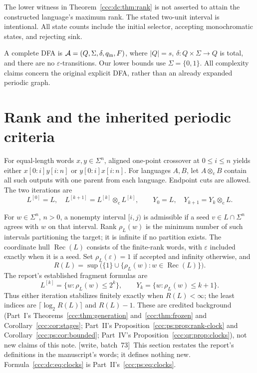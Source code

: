 \documentclass[11pt,letterpaper]{article}
\theoremstyle{definition}
\theoremstyle{remark}
\newcommand{\eps}{\varepsilon}
\newcommand{\rec}{\operatorname{Rec}}
\newcommand{\cut}{\otimes_{\mathrm c}}
\newcommand{\rank}{\rho}
\newcommand{\wsevthree}{\textup{[write, batch~73]}}
\begin{document}
The lower witness in Theorem~\ref{ccc:dc:thm:rank} is not asserted to attain the constructed language's maximum rank. The stated two-unit interval is intentional. All state counts include the initial selector, accepting monochromatic states, and rejecting sink.

A complete DFA is $\mathcal A=(Q,\Sigma,\delta,q_{\rm in},F)$, where $|Q|=s$, $\delta:Q\times\Sigma\to Q$ is total, and there are no $\eps$-transitions. Our lower bounds use $\Sigma=\{0,1\}$. All complexity claims concern the original explicit DFA, rather than an already expanded periodic graph.

\section{Rank and the inherited periodic criteria}\label{ccc:dc:sec:background}

For equal-length words $x,y\in\Sigma^n$, aligned one-point crossover at $0\le i\le n$ yields either $x[0:i]y[i:n]$ or $y[0:i]x[i:n]$. For languages $A,B$, let $A\cut B$ contain all such outputs with one parent from each language. Endpoint cuts are allowed. The two iterations are
\[
L^{[0]}=L,\quad L^{[k+1]}=L^{[k]}\cut L^{[k]},
\qquad Y_0=L,\quad Y_{k+1}=Y_k\cut L.
\]

For $w\in\Sigma^n$, $n>0$, a nonempty interval $[i,j)$ is admissible if a seed $v\in L\cap\Sigma^n$ agrees with $w$ on that interval. Rank $\rank_L(w)$ is the minimum number of such intervals partitioning the target; it is infinite if no partition exists. The coordinate hull $\rec(L)$ consists of the finite-rank words, with $\eps$ included exactly when it is a seed. Set $\rank_L(\eps)=1$ if accepted and infinity otherwise, and
\[
R(L)=\sup\bigl(\{1\}\cup\{\rank_L(w):w\in\rec(L)\}\bigr).
\]
The report's established fragment formulas are
\begin{equation}\label{ccc:dc:eq:clocks}
L^{[k]}=\{w:\rank_L(w)\le2^k\},\qquad
Y_k=\{w:\rank_L(w)\le k+1\}.
\end{equation}
Thus either iteration stabilizes finitely exactly when $R(L)<\infty$; the least indices are $\lceil\log_2R(L)\rceil$ and $R(L)-1$. These are credited background (Part~I's Theorems~\ref{ccc:thm:generation} and~\ref{ccc:thm:frozen} and Corollary~\ref{ccc:cor:stages}; Part~II's Proposition~\ref{ccc:ps:prop:rank-clock} and Corollary~\ref{ccc:ps:cor:bounded}; Part~IV's Proposition~\ref{ccc:qr:prop:clocks}), not new claims of this note.
\wsevthree\ This section restates the report's definitions in the
manuscript's words; it defines nothing new. Formula~\eqref{ccc:dc:eq:clocks}
is Part~II's~\eqref{ccc:ps:eq:clocks}.
\end{document}
